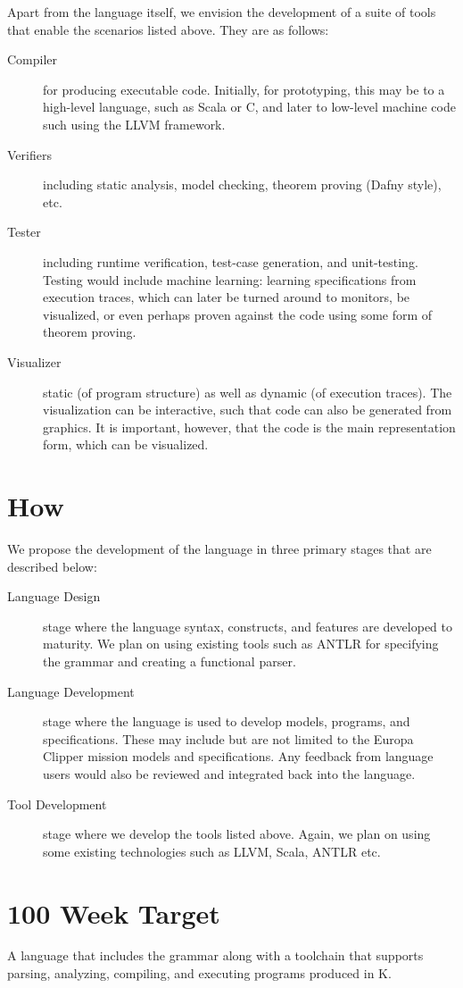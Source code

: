 \documentclass{llncs}
\newcommand{\lang}{K}
\begin{document}
Apart from the language itself, we envision the development of a suite
of tools that enable the scenarios listed above. They are as follows:

\begin{description}

  \item [Compiler] for producing executable code. Initially, for
    prototyping, this may be to a high-level language, such as Scala
    or C, and later to low-level machine code such using the LLVM
    framework.

  \item [Verifiers] including static analysis, model checking, theorem
    proving (Dafny style), etc.
    
  \item [Tester] including runtime verification, test-case generation,
    and unit-testing. Testing would include machine learning: learning
    specifications from execution traces, which can later be turned
    around to monitors, be visualized, or even perhaps proven against
    the code using some form of theorem proving.
    
  \item [Visualizer] static (of program structure) as well as dynamic
    (of execution traces). The visualization can be interactive, such
    that code can also be generated from graphics.  It is important,
    however, that the code is the main representation form, which can
    be visualized.

\end{description}

\section{How}

We propose the development of the language in three primary stages that
are described below:

\begin{description}

\item [Language Design] stage where the language syntax, constructs,
  and features are developed to maturity. We plan on using existing
  tools such as ANTLR for specifying the grammar and creating a
  functional parser.

\item [Language Development] stage where the language is used to
  develop models, programs, and specifications. These may include but
  are not limited to the Europa Clipper mission models and
  specifications. Any feedback from language users would also be
  reviewed and integrated back into the language.

\item [Tool Development] stage where we develop the tools listed
  above. Again, we plan on using some existing technologies such as
  LLVM, Scala, ANTLR etc.

\end{description}

\section{100 Week Target}

A language that includes the grammar along with a toolchain that
supports parsing, analyzing, compiling, and executing programs
produced in \lang{}.
\end{document}
